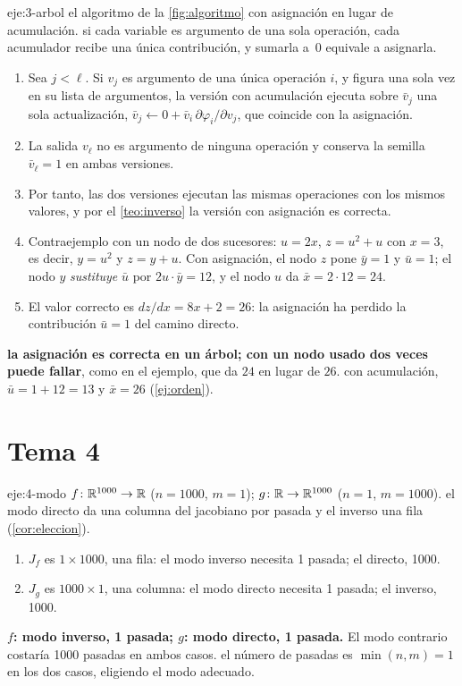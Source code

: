 \begin{solucion}{eje:3-arbol}
\datos el algoritmo de la \cref{fig:algoritmo} con asignación en lugar de acumulación.
\planteamiento si cada variable es argumento de una sola operación, cada acumulador recibe una única contribución, y sumarla a~0 equivale a asignarla.
\pasos
\begin{enumerate}[label=\arabic*.]
  \item Sea $j<\ell$. Si $v_j$ es argumento de una única operación $i$, y figura una sola vez en su lista de argumentos, la versión con acumulación ejecuta sobre $\bar v_j$ una sola actualización, $\bar v_j\gets 0+\bar v_i\,\partial\varphi_i/\partial v_j$, que coincide con la asignación.
  \item La salida $v_\ell$ no es argumento de ninguna operación y conserva la semilla $\bar v_\ell=1$ en ambas versiones.
  \item Por tanto, las dos versiones ejecutan las mismas operaciones con los mismos valores, y por el \cref{teo:inverso} la versión con asignación es correcta.
  \item Contraejemplo con un nodo de dos sucesores: $u=2x$, $z=u^{2}+u$ con $x=3$, es decir, $y=u^{2}$ y $z=y+u$. Con asignación, el nodo $z$ pone $\bar y=1$ y $\bar u=1$; el nodo $y$ \emph{sustituye} $\bar u$ por $2u\cdot\bar y=12$, y el nodo $u$ da $\bar x=2\cdot 12=24$.
  \item El valor correcto es $dz/dx=8x+2=26$: la asignación ha perdido la contribución $\bar u=1$ del camino directo.
\end{enumerate}
\resultado \textbf{la asignación es correcta en un árbol; con un nodo usado dos veces puede fallar}, como en el ejemplo, que da $24$ en lugar de $26$.
\comprobacion con acumulación, $\bar u=1+12=13$ y $\bar x=26$ (\cref{ej:orden}).
\end{solucion}

\section{Tema 4}

\begin{solucion}{eje:4-modo}
\datos $f\colon\mathbb{R}^{1000}\to\mathbb{R}$ ($n=1000$, $m=1$); $g\colon\mathbb{R}\to\mathbb{R}^{1000}$ ($n=1$, $m=1000$).
\planteamiento el modo directo da una columna del jacobiano por pasada y el inverso una fila (\cref{cor:eleccion}).
\pasos
\begin{enumerate}[label=\arabic*.]
  \item $J_f$ es $1\times 1000$, una fila: el modo inverso necesita 1 pasada; el directo, 1000.
  \item $J_g$ es $1000\times 1$, una columna: el modo directo necesita 1 pasada; el inverso, 1000.
\end{enumerate}
\resultado \textbf{$f$: modo inverso, 1 pasada; $g$: modo directo, 1 pasada.} El modo contrario costaría 1000 pasadas en ambos casos.
\comprobacion el número de pasadas es $\min(n,m)=1$ en los dos casos, eligiendo el modo adecuado.
\end{solucion}

